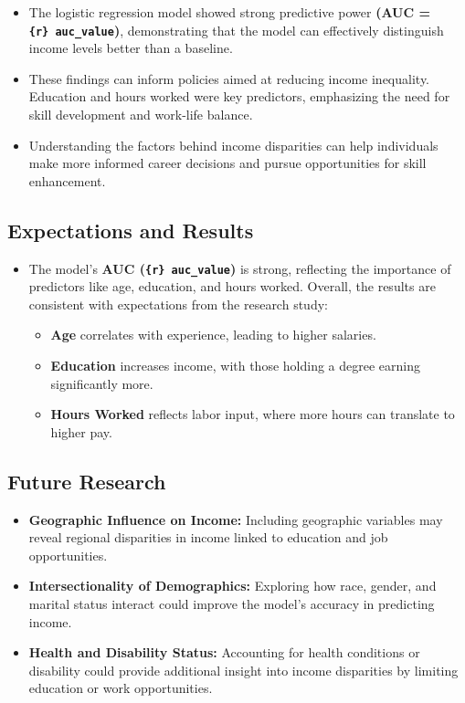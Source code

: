 \documentclass[
  letterpaper,
  DIV=11,
  numbers=noendperiod]{scrartcl}
\providecommand{\tightlist}{%
  \setlength{\itemsep}{0pt}\setlength{\parskip}{0pt}}\usepackage{longtable,booktabs,array}
\begin{document}
\begin{itemize}
\tightlist
\item
  The logistic regression model showed strong predictive power
  \textbf{(AUC =\texttt{\{r\}\ auc\_value})}, demonstrating that the
  model can effectively distinguish income levels better than a
  baseline.
\item
  These findings can inform policies aimed at reducing income
  inequality. Education and hours worked were key predictors,
  emphasizing the need for skill development and work-life balance.
\item
  Understanding the factors behind income disparities can help
  individuals make more informed career decisions and pursue
  opportunities for skill enhancement.
\end{itemize}

\hypertarget{expectations-and-results}{%
\subsection{Expectations and Results}\label{expectations-and-results}}

\begin{itemize}
\tightlist
\item
  The model's \textbf{AUC (\texttt{\{r\}\ auc\_value})} is strong,
  reflecting the importance of predictors like age, education, and hours
  worked. Overall, the results are consistent with expectations from the
  research study:

  \begin{itemize}
  \tightlist
  \item
    \textbf{Age} correlates with experience, leading to higher salaries.
  \item
    \textbf{Education} increases income, with those holding a degree
    earning significantly more.
  \item
    \textbf{Hours Worked} reflects labor input, where more hours can
    translate to higher pay.
  \end{itemize}
\end{itemize}

\hypertarget{future-research}{%
\subsection{Future Research}\label{future-research}}

\begin{itemize}
\tightlist
\item
  \textbf{Geographic Influence on Income:} Including geographic
  variables may reveal regional disparities in income linked to
  education and job opportunities.
\item
  \textbf{Intersectionality of Demographics:} Exploring how race,
  gender, and marital status interact could improve the model's accuracy
  in predicting income.
\item
  \textbf{Health and Disability Status:} Accounting for health
  conditions or disability could provide additional insight into income
  disparities by limiting education or work opportunities.
\end{itemize}
\end{document}
